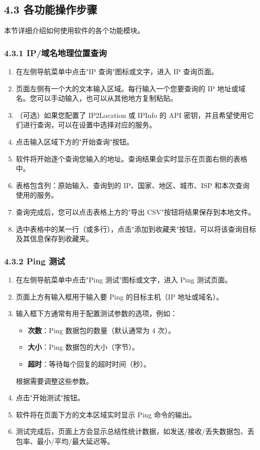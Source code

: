\documentclass{article}
\begin{document}
\subsection*{4.3 各功能操作步骤}

本节详细介绍如何使用软件的各个功能模块。

\subsubsection*{4.3.1 IP/域名地理位置查询}

\begin{enumerate}[label=\arabic*.]
    \item 在左侧导航菜单中点击"IP 查询"图标或文字，进入 IP 查询页面。
    \item 页面左侧有一个大的文本输入区域。每行输入一个您要查询的 IP 地址或域名。您可以手动输入，也可以从其他地方复制粘贴。
    \item （可选）如果您配置了 IP2Location 或 IPInfo 的 API 密钥，并且希望使用它们进行查询，可以在设置中选择对应的服务。
    \item 点击输入区域下方的"开始查询"按钮。
    \item 软件将开始逐个查询您输入的地址。查询结果会实时显示在页面右侧的表格中。
    \item 表格包含列：原始输入、查询到的 IP、国家、地区、城市、ISP 和本次查询使用的服务。
    \item 查询完成后，您可以点击表格上方的"导出 CSV"按钮将结果保存到本地文件。
    \item 选中表格中的某一行（或多行），点击"添加到收藏夹"按钮，可以将该查询目标及其信息保存到收藏夹。
\end{enumerate}

\subsubsection*{4.3.2 Ping 测试}

\begin{enumerate}[label=\arabic*.]
    \item 在左侧导航菜单中点击"Ping 测试"图标或文字，进入 Ping 测试页面。
    \item 页面上方有输入框用于输入要 Ping 的目标主机（IP 地址或域名）。
    \item 输入框下方通常有用于配置测试参数的选项，例如：
    \begin{itemize}
        \item \textbf{次数}：Ping 数据包的数量（默认通常为 4 次）。
        \item \textbf{大小}：Ping 数据包的大小（字节）。
        \item \textbf{超时}：等待每个回复的超时时间（秒）。
    \end{itemize}
    根据需要调整这些参数。
    \item 点击"开始测试"按钮。
    \item 软件将在页面下方的文本区域实时显示 Ping 命令的输出。
    \item 测试完成后，页面上方会显示总结性统计数据，如发送/接收/丢失数据包、丢包率、最小/平均/最大延迟等。
\end{enumerate}
\end{document}
